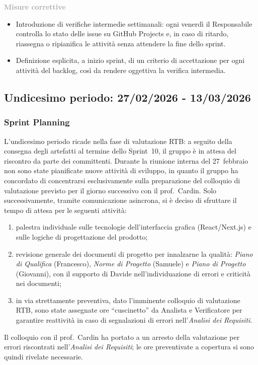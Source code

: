 \documentclass[a4paper, 11pt, oneside]{scrartcl} %
\begin{document}
\vspace{0.1cm}
\noindent\textcolor{DarkGray}{\textbf{Misure correttive}}
\begin{itemize}[noitemsep, topsep=2pt]
  \item Introduzione di verifiche intermedie settimanali: ogni venerdì il Responsabile controlla lo stato delle issue su GitHub Projects e, in caso di ritardo, riassegna o ripianifica le attività senza attendere la fine dello sprint.
  \item Definizione esplicita, a inizio sprint, di un criterio di accettazione per ogni attività del backlog, così da rendere oggettiva la verifica intermedia.
\end{itemize}


\newpage

\subsection{Undicesimo periodo: 27/02/2026 - 13/03/2026}

\subsubsection*{Sprint Planning}

L'undicesimo periodo ricade nella fase di valutazione RTB: a seguito della consegna degli artefatti al termine dello Sprint~10, il gruppo è in attesa del riscontro da parte dei committenti.
Durante la riunione interna del 27~febbraio non sono state pianificate nuove attività di sviluppo, in quanto il gruppo ha concordato di concentrarsi esclusivamente sulla preparazione del colloquio di valutazione previsto per il giorno successivo con il prof.~Cardin.
Solo successivamente, tramite comunicazione asincrona, si è deciso di sfruttare il tempo di attesa per le seguenti attività:
\begin{enumerate}[noitemsep, topsep=2pt]
  \item palestra individuale sulle tecnologie dell'interfaccia grafica (React/Next.js) e sulle logiche di progettazione del prodotto;
  \item revisione generale dei documenti di progetto per innalzarne la qualità: \textit{Piano di Qualifica} (Francesco), \textit{Norme di Progetto} (Samuele) e \textit{Piano di Progetto} (Giovanni), con il supporto di Davide nell'individuazione di errori e criticità nei documenti;
  \item in via strettamente preventiva, dato l'imminente colloquio di valutazione RTB, sono state assegnate ore ``cuscinetto'' da Analista e Verificatore per garantire reattività in caso di segnalazioni di errori nell'\textit{Analisi dei Requisiti}.
\end{enumerate}
Il colloquio con il prof.~Cardin ha portato a un arresto della valutazione per errori riscontrati nell'\textit{Analisi dei Requisiti}; le ore preventivate a copertura si sono quindi rivelate necessarie.
\end{document}

